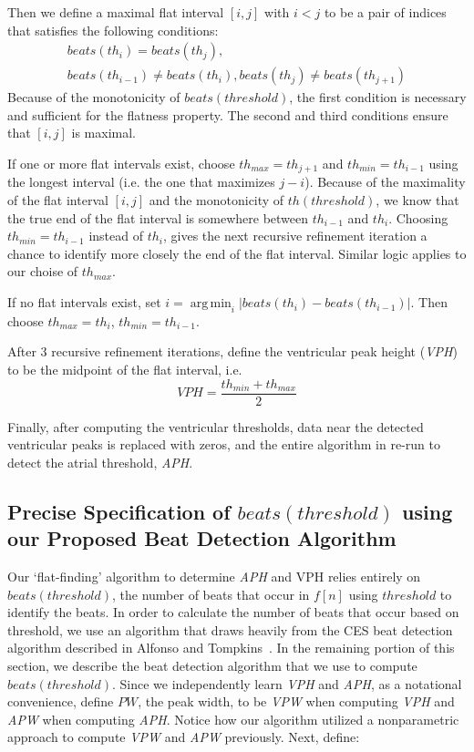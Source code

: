 \documentclass[conference]{IEEEtran}
\newcommand{\APW}{\textit{APW}}
\newcommand{\VPW}{\textit{VPW}}
\newcommand{\APH}{\textit{APH}}
\newcommand{\VPH}{\textit{VPH}}
\DeclareMathOperator*{\argmin}{arg\,min}
\begin{document}
Then we define a maximal flat interval $[i,j]$ with $i<j$ to be a pair of indices that satisfies the following conditions:
\begin{multline*}
	beats(th_i) = beats(th_j),\\ beats(th_{i-1}) \ne beats(th_i), beats(th_j) \ne beats(th_{j+1})
\end{multline*}
Because of the monotonicity of $beats(threshold)$, the first condition is necessary and sufficient for the flatness property.
The second and third conditions ensure that $[i,j]$ is maximal.

If one or more flat intervals exist, choose $th_{max} = th_{j+1}$ and $th_{min}=th_{i-1}$ using the longest interval (i.e. the one that maximizes $j-i$).
Because of the maximality of the flat interval $[i,j]$ and the monotonicity of $th(threshold)$, 
we know that the true end of the flat interval is somewhere between $th_{i-1}$ and $th_i$. 
Choosing $th_{min} = th_{i-1}$ instead of $th_{i}$, gives the next recursive refinement iteration a chance to identify more closely the end of the flat interval.
Similar logic applies to our choise of $th_{max}$.

If no flat intervals exist, set $i=\argmin_{i} |beats(th_i) - beats(th_{i-1})|$.
Then choose $th_{max} = th_i$, $th_{min} = th_{i-1}$.

After 3 recursive refinement iterations, define the ventricular peak height (\VPH{}) to be the midpoint of the flat interval, i.e.
\begin{equation*}
	VPH=\frac{th_{min}+th_{max}}{2}
\end{equation*}

Finally, after computing the ventricular thresholds,
data near the detected ventricular peaks is replaced with
zeros, and the entire algorithm in re-run to detect the
atrial threshold, \APH{}.

\subsection{Precise Specification of $beats(threshold)$ using our Proposed Beat Detection Algorithm}
Our `flat-finding' algorithm to determine \APH{} and
VPH relies entirely on $beats(threshold)$, 
the number of beats that occur in $f[n]$ using
$threshold$ to identify the beats. In order to calculate the
number of beats that occur based on threshold, we use
an algorithm that draws heavily from the CES beat
detection algorithm described in Alfonso and Tompkins~\cite{realtime-qrs}.
In the remaining portion of this section, we describe
the beat detection algorithm that we use to compute
$beats(threshold)$.
Since we independently learn \VPH{} and \APH{}, as a notational convenience, define $PW$, the peak width, to be \VPW{} when computing \VPH{} and \APW{} when computing \APH{}.
Notice how our algorithm utilized a nonparametric
approach to compute \VPW{} and \APW{} previously. %
Next, define:
\end{document}
